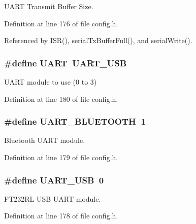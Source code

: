 U\-A\-R\-T Transmit Buffer Size. 



Definition at line 176 of file config.\-h.



Referenced by I\-S\-R(), serial\-Tx\-Buffer\-Full(), and serial\-Write().

\hypertarget{group__config_gaf7cb12b462b4594bd759d1b4e241ec4c}{
\subsubsection[{U\-A\-R\-T}]{\setlength{\rightskip}{0pt plus 5cm}\#define U\-A\-R\-T~{\bf U\-A\-R\-T\-\_\-\-U\-S\-B}}}\label{group__config_gaf7cb12b462b4594bd759d1b4e241ec4c}


U\-A\-R\-T module to use (0 to 3) 



Definition at line 180 of file config.\-h.

\hypertarget{group__config_ga2c948aa36e7c71b5e04623c1f560f1f1}{
\subsubsection[{U\-A\-R\-T\-\_\-\-B\-L\-U\-E\-T\-O\-O\-T\-H}]{\setlength{\rightskip}{0pt plus 5cm}\#define U\-A\-R\-T\-\_\-\-B\-L\-U\-E\-T\-O\-O\-T\-H~1}}\label{group__config_ga2c948aa36e7c71b5e04623c1f560f1f1}


Bluetooth U\-A\-R\-T module. 



Definition at line 179 of file config.\-h.

\hypertarget{group__config_ga9757131cd175465e6220de58b57f6b78}{
\subsubsection[{U\-A\-R\-T\-\_\-\-U\-S\-B}]{\setlength{\rightskip}{0pt plus 5cm}\#define U\-A\-R\-T\-\_\-\-U\-S\-B~0}}\label{group__config_ga9757131cd175465e6220de58b57f6b78}


F\-T232\-R\-L U\-S\-B U\-A\-R\-T module. 



Definition at line 178 of file config.\-h.

